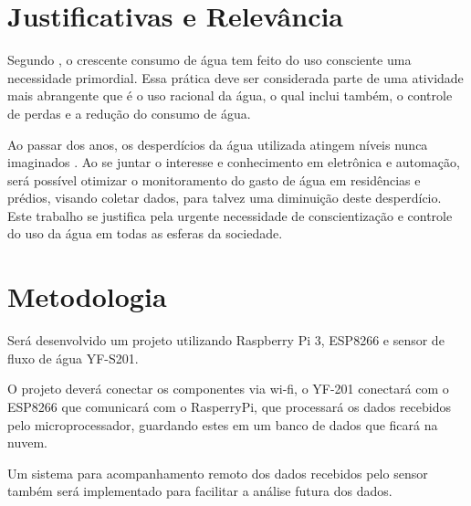 \section{Justificativas e Relev{\^a}ncia}
%
Segundo \cite{AlvesDaSilva}, o crescente consumo de água
tem feito do uso consciente uma necessidade primordial. Essa prática deve ser considerada parte de uma atividade mais abrangente que é o uso racional da água, o qual inclui também, o controle de perdas e a redução do consumo de água.

Ao passar dos anos, os desperdícios da água utilizada atingem níveis nunca imaginados \cite{rebouccas2003agua}. Ao se juntar o interesse e conhecimento em eletrônica e automação, será possível otimizar o monitoramento do gasto de água em residências e prédios, visando coletar dados, para talvez uma diminuição deste desperdício. Este trabalho se justifica pela urgente necessidade de conscientização e controle do uso da água em todas as esferas da sociedade. 
%
\section{Metodologia}

Será desenvolvido um projeto utilizando Raspberry Pi 3, ESP8266 e sensor de fluxo de água YF-S201.

O projeto deverá conectar os componentes via wi-fi, o YF-201 conectará com o ESP8266 que comunicará com o RasperryPi, que processará os dados recebidos pelo microprocessador, guardando estes em um banco de dados que ficará na nuvem.

Um sistema para acompanhamento remoto dos dados recebidos pelo sensor também será implementado para facilitar a análise futura dos dados.